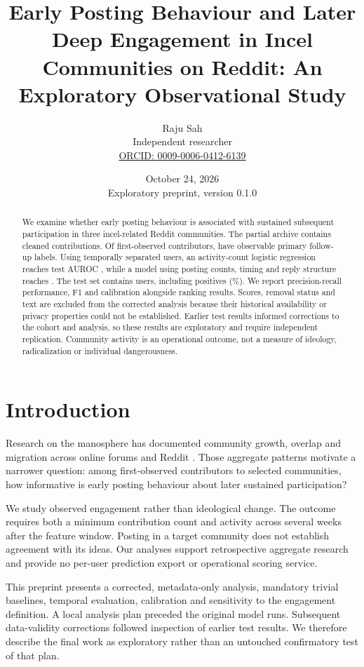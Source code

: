 \documentclass[10pt,twocolumn]{article}
\title{Early Posting Behaviour and Later Deep Engagement in Incel Communities on Reddit: An Exploratory Observational Study}
\author{Raju Sah\\Independent researcher\\\small\href{https://orcid.org/0009-0006-0412-6139}{ORCID: 0009-0006-0412-6139}}
\date{October 24, 2026\\\small Exploratory preprint, version 0.1.0}
\begin{document}
\maketitle

\begin{abstract}
We examine whether early posting behaviour is associated with sustained subsequent participation in three incel-related Reddit communities. The partial archive contains \NKept{} cleaned contributions. Of \NCohort{} first-observed contributors, \NEligA{} have observable primary follow-up labels. Using temporally separated users, an activity-count logistic regression reaches test AUROC \AurocCIAct{}, while a model using posting counts, timing and reply structure reaches \AurocCILgbm{}. The test set contains \NTest{} users, including \PosTest{} positives (\RateTest\%). We report precision-recall performance, F1 and calibration alongside ranking results. Scores, removal status and text are excluded from the corrected analysis because their historical availability or privacy properties could not be established. Earlier test results informed corrections to the cohort and analysis, so these results are exploratory and require independent replication. Community activity is an operational outcome, not a measure of ideology, radicalization or individual dangerousness.
\end{abstract}

\section{Introduction}
Research on the manosphere has documented community growth, overlap and migration across online forums and Reddit \cite{ribeiro2021}. Those aggregate patterns motivate a narrower question: among first-observed contributors to selected communities, how informative is early posting behaviour about later sustained participation?

We study observed engagement rather than ideological change. The outcome requires both a minimum contribution count and activity across several weeks after the feature window. Posting in a target community does not establish agreement with its ideas. Our analyses support retrospective aggregate research and provide no per-user prediction export or operational scoring service.

This preprint presents a corrected, metadata-only analysis, mandatory trivial baselines, temporal evaluation, calibration and sensitivity to the engagement definition. A local analysis plan preceded the original model runs. Subsequent data-validity corrections followed inspection of earlier test results. We therefore describe the final work as exploratory rather than an untouched confirmatory test of that plan.
\end{document}
